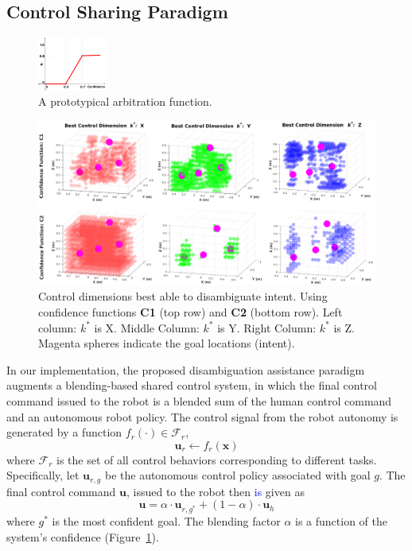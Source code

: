 \documentclass[conference]{IEEEtran}
\begin{document}
\subsection{Control Sharing Paradigm}\label{BP}
\begin{figure}
	\begin{center}
		\vspace{-0.9cm}
		\includegraphics[width=0.2\textwidth]{./figures/ArbFunc_New1.png}
	\end{center}
	\vspace{-.3cm}
	\caption{A prototypical arbitration function.}
	\label{ALPHA}
\end{figure}
\begin{figure}[ht]
	\centering
	\includegraphics[width = 1\hsize, height = 0.35\vsize]{./figures/POINT_CLOUD.png}
	\caption{Control dimensions best able to disambiguate intent. Using confidence functions \textbf{C1} (top row) and \textbf{C2} (bottom row). Left column: $k^*$ is X. Middle Column: $k^*$ is Y. Right Column: $k^*$ is Z. Magenta spheres indicate the goal locations (intent).}
	\label{HM_SEP}
\end{figure}
In our implementation, the proposed disambiguation assistance paradigm augments a blending-based shared control system, in which the final control command issued to the robot is a blended sum of the human control command and an autonomous robot policy. 
The control signal from the robot autonomy is generated by a function $f_{r}(\cdot) \in \mathcal{F}_{r}$, 
\begin{equation*}
\boldsymbol{u}_r \leftarrow f_{r}(\boldsymbol{x})
\end{equation*}
where $\mathcal{F}_{r}$ is the set of all control behaviors corresponding to different tasks.
Specifically, let $\boldsymbol{u}_{r,g}$ be the autonomous control policy associated with goal $g$. The final control command $\boldsymbol{u}$, issued to the robot then \textcolor{blue}{is} given as 
\begin{equation*}
\boldsymbol{u} = \alpha\cdot \boldsymbol{u}_{r,g^*} + (1 - \alpha)\cdot \boldsymbol{u}_h
\end{equation*}
where $g^*$ is the most confident goal. The blending factor $\alpha$ is a function of the system's confidence (Figure~\ref{ALPHA}).
\end{document}
